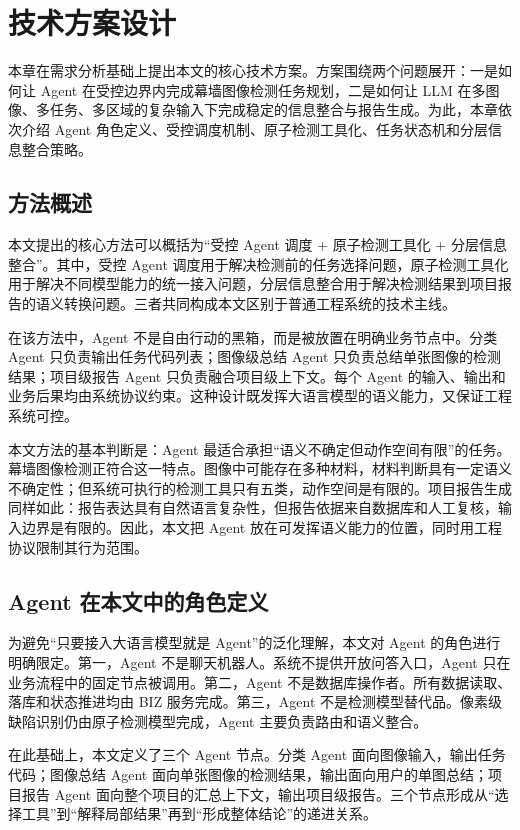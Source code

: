 \chapter{技术方案设计}
\label{chap:agent-method}

本章在需求分析基础上提出本文的核心技术方案。方案围绕两个问题展开：一是如何让 Agent 在受控边界内完成幕墙图像检测任务规划，二是如何让 LLM 在多图像、多任务、多区域的复杂输入下完成稳定的信息整合与报告生成。为此，本章依次介绍 Agent 角色定义、受控调度机制、原子检测工具化、任务状态机和分层信息整合策略。

\section{方法概述}
\label{sec:method-overview}

本文提出的核心方法可以概括为“受控 Agent 调度 + 原子检测工具化 + 分层信息整合”。其中，受控 Agent 调度用于解决检测前的任务选择问题，原子检测工具化用于解决不同模型能力的统一接入问题，分层信息整合用于解决检测结果到项目报告的语义转换问题。三者共同构成本文区别于普通工程系统的技术主线。

在该方法中，Agent 不是自由行动的黑箱，而是被放置在明确业务节点中。分类 Agent 只负责输出任务代码列表；图像级总结 Agent 只负责总结单张图像的检测结果；项目级报告 Agent 只负责融合项目级上下文。每个 Agent 的输入、输出和业务后果均由系统协议约束。这种设计既发挥大语言模型的语义能力，又保证工程系统可控。

本文方法的基本判断是：Agent 最适合承担“语义不确定但动作空间有限”的任务。幕墙图像检测正符合这一特点。图像中可能存在多种材料，材料判断具有一定语义不确定性；但系统可执行的检测工具只有五类，动作空间是有限的。项目报告生成同样如此：报告表达具有自然语言复杂性，但报告依据来自数据库和人工复核，输入边界是有限的。因此，本文把 Agent 放在可发挥语义能力的位置，同时用工程协议限制其行为范围。

\section{Agent 在本文中的角色定义}
\label{sec:agent-role-definition}

为避免“只要接入大语言模型就是 Agent”的泛化理解，本文对 Agent 的角色进行明确限定。第一，Agent 不是聊天机器人。系统不提供开放问答入口，Agent 只在业务流程中的固定节点被调用。第二，Agent 不是数据库操作者。所有数据读取、落库和状态推进均由 BIZ 服务完成。第三，Agent 不是检测模型替代品。像素级缺陷识别仍由原子检测模型完成，Agent 主要负责路由和语义整合。

在此基础上，本文定义了三个 Agent 节点。分类 Agent 面向图像输入，输出任务代码；图像总结 Agent 面向单张图像的检测结果，输出面向用户的单图总结；项目报告 Agent 面向整个项目的汇总上下文，输出项目级报告。三个节点形成从“选择工具”到“解释局部结果”再到“形成整体结论”的递进关系。

